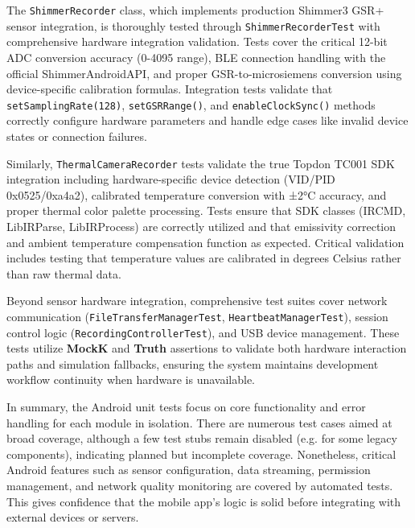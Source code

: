 The \texttt{ShimmerRecorder} class, which implements production Shimmer3 GSR+ sensor integration, is thoroughly tested through \texttt{ShimmerRecorderTest} with comprehensive hardware integration validation. Tests cover the critical 12-bit ADC conversion accuracy (0-4095 range), BLE connection handling with the official ShimmerAndroidAPI, and proper GSR-to-microsiemens conversion using device-specific calibration formulas. Integration tests validate that \texttt{setSamplingRate(128)}, \texttt{setGSRRange()}, and \texttt{enableClockSync()} methods correctly configure hardware parameters and handle edge cases like invalid device states or connection failures.

Similarly, \texttt{ThermalCameraRecorder} tests validate the true Topdon TC001 SDK integration including hardware-specific device detection (VID/PID 0x0525/0xa4a2), calibrated temperature conversion with ±2°C accuracy, and proper thermal color palette processing. Tests ensure that SDK classes (IRCMD, LibIRParse, LibIRProcess) are correctly utilized and that emissivity correction and ambient temperature compensation function as expected. Critical validation includes testing that temperature values are calibrated in degrees Celsius rather than raw thermal data.

Beyond sensor hardware integration, comprehensive test suites cover network communication (\texttt{FileTransferManagerTest}, \texttt{HeartbeatManagerTest}), session control logic (\texttt{RecordingControllerTest}), and USB device management. These tests utilize \textbf{MockK} and \textbf{Truth} assertions to validate both hardware interaction paths and simulation fallbacks, ensuring the system maintains development workflow continuity when hardware is unavailable.

In summary, the Android unit tests focus on core functionality and error handling for each module in isolation. There are numerous test cases aimed at broad coverage, although a few test stubs remain disabled (e.g. for some legacy components), indicating planned but incomplete coverage. Nonetheless, critical Android features such as sensor configuration, data streaming, permission management, and network quality monitoring are covered by automated tests. This gives confidence that the mobile app's logic is solid before integrating with external devices or servers.

